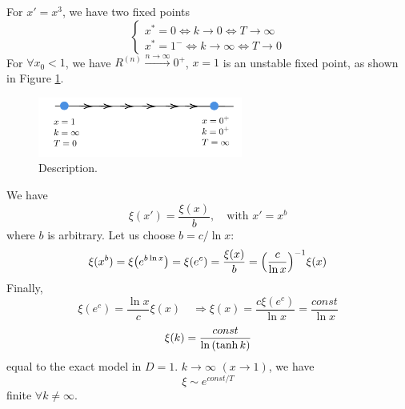 \documentclass[../main/main.tex]{subfiles}
\begin{document}
For \( x' = x^3 \), we have two fixed points
\begin{equation}
  \begin{cases}
   x^* = 0 \iff k \rightarrow 0 \iff T \rightarrow \infty \\
   x^* = 1^- \iff k \rightarrow \infty  \iff T \rightarrow 0
  \end{cases}
\end{equation}
For \( \forall x_0 < 1 \), we have \( R^{(n)} \overset{n \rightarrow \infty }{\longrightarrow} 0^+ \), \( x=1 \) is an unstable fixed point, as shown in Figure  \ref{fig:20_3}.
\begin{figure}[h!]
\centering
\includegraphics[width=0.6\textwidth]{../lessons/20_image/3.pdf}
\caption{\label{fig:20_3} Description.}
\end{figure}
We have
\begin{equation}
  \xi (x') = \frac{\xi (x)}{b}, \quad \text{with } x' = x^b
\end{equation}
where \( b \) is arbitrary. Let us choose \( b = c / \ln{x}  \):
\begin{equation}
  \xi (x^b) = \xi  \qty(e ^{b \ln{x} }) = \xi (e^c) = \frac{\xi (x)}{b}
  = \qty(\frac{c}{\ln{x} })^{-1} \xi (x)
\end{equation}
Finally,
\begin{equation}
  \xi (e^c) = \frac{\ln{x} }{c} \xi (x) \quad \Rightarrow \xi (x) = \frac{c \xi (e^c)}{\ln{x} } = \frac{const}{\ln{x} }
\end{equation}
\begin{equation}
  \xi (k) = \frac{const}{\ln{\qty(\tanh k) } }
\end{equation}
equal to the exact model in \( D=1 \).
\( k \rightarrow \infty  \) \( (x \rightarrow 1) \), we have
\begin{equation}
  \xi \sim e^{const/T}
\end{equation}
finite \( \forall k \neq \infty  \).
\end{document}
